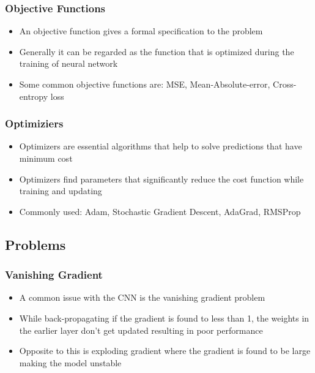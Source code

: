 \documentclass{tron}
\begin{document}
\subsubsection{Objective Functions}
\begin{itemize}
	\item An objective function gives a formal specification to the problem
	\item Generally it can be regarded as the function that is optimized during the training of neural network
	\item Some common objective functions are: MSE, Mean-Absolute-error, Cross-entropy loss
\end{itemize}



\subsubsection{Optimiziers}
\begin{itemize}
	\item Optimizers are essential algorithms that help to solve predictions that have minimum cost
	\item Optimizers find parameters that significantly reduce the cost function while training and updating
	\item Commonly used: Adam, Stochastic Gradient Descent, AdaGrad, RMSProp
\end{itemize}


\newpage
\subsection{Problems}
\subsubsection{Vanishing Gradient}
\begin{itemize}
	\item A common issue with the CNN is the vanishing gradient problem
	\item While back-propagating if the gradient is found to less than 1, the weights in the earlier layer don't get updated resulting in poor performance
	\item Opposite to this is exploding gradient where the gradient is found to be large making the model unstable
\end{itemize}

\end{document}
